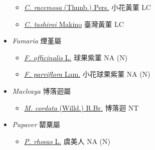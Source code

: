 \begin{itemize}
\begin{itemize}
        \item[] \href{http://www.theplantlist.org/tpl1.1/search?q=Corydalis+racemosa}{\textit{C. racemosa} (Thunb.) Pers.}   小花黃菫   LC
        \item[] \href{http://www.theplantlist.org/tpl1.1/search?q=Corydalis+tashiroi}{\textit{C. tashiroi} Makino}   臺灣黃菫   LC
  \end{itemize}
 \item[] \textit{Fumaria} 煙堇屬
                                
  \begin{itemize}
        \item[] \href{http://www.theplantlist.org/tpl1.1/search?q=Fumaria+officinalis}{\textit{F. officinalis} L.}   球果紫菫   NA (N)
        \item[] \href{http://www.theplantlist.org/tpl1.1/search?q=Fumaria+parviflora}{\textit{F. parviflora} Lam.}   小花球果紫菫   NA (N)
  \end{itemize}
 \item[] \textit{Macleaya} 博落迴屬
                                
  \begin{itemize}
        \item[] \href{http://www.theplantlist.org/tpl1.1/search?q=Macleaya+cordata}{\textit{M. cordata} (Willd.) R.Br.}   博落迴   NT
  \end{itemize}
 \item[] \textit{Papaver} 罌粟屬
                                
  \begin{itemize}
        \item[] \href{http://www.theplantlist.org/tpl1.1/search?q=Papaver+rhoeas}{\textit{P. rhoeas} L.}   虞美人   NA (N)
  \end{itemize}
  \end{itemize}
